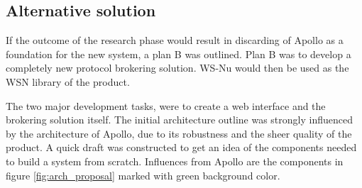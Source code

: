 \begin{table}[ht!]
\centering
{}
\caption{Risk analysis for building the system based on Apollo}
\label{tab:risk_analysis_apollo}
\end{table}

\subsection{Alternative solution}
\label{subsec:prestudies-alternate_solution}

If the outcome of the research phase would result in discarding of Apollo as a foundation for the new system, a plan B was outlined. Plan B was to develop a completely new protocol brokering solution. WS-Nu would then be used as the WSN library of the product. 

The two major development tasks, were to create a web interface and the brokering solution itself. The initial architecture outline was strongly influenced by the architecture of Apollo, due to its robustness and the sheer quality of the product. A quick draft was constructed to get an idea of the components needed to build a system from scratch. Influences from Apollo are the components in figure \ref{fig:arch_proposal} marked with green background color.

